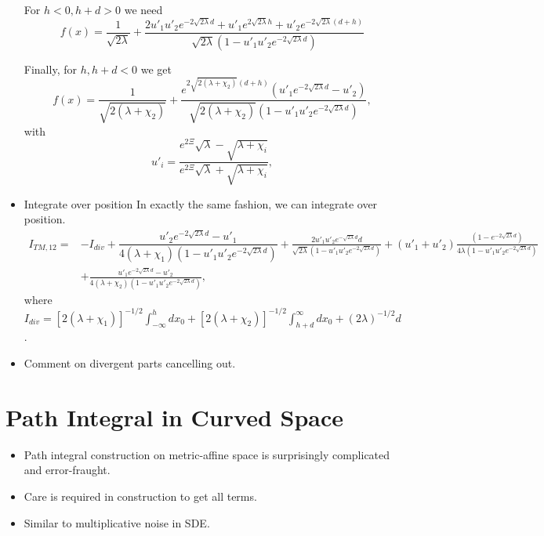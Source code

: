 \begin{itemize}
    For $h<0, h+d>0$ we need 
    \begin{equation}
      f(x) = \frac{1}{\sqrt{2\lambda}} + \frac{2u'_1u'_2 e^{-2\sqrt{2\lambda}d} + u'_1 e^{2\sqrt{2\lambda}h} +u'_2 e^{-2\sqrt{2\lambda}(d+h)}}{\sqrt{2\lambda}(1-u'_1u'_2 e^{-2\sqrt{2\lambda}d})}
    \end{equation}

    Finally, for $h,h+d<0$ we get 
    \begin{equation}
      f(x) =  \frac{1}{\sqrt{2(\lambda+\chi_2)}} + \frac{e^{2\sqrt{2(\lambda+\chi_2)}(d+h)}(u'_1 e^{-2\sqrt{2\lambda}d} - u'_2)}{\sqrt{2(\lambda+\chi_2)}(1-u'_1u'_2 e^{-2\sqrt{2\lambda}d})},
    \end{equation}
    with 
    \begin{equation}
      u'_i = \frac{e^{2\Xi}\sqrt{\lambda} -\sqrt{\lambda+\chi_i}}{e^{2\Xi}\sqrt{\lambda} + \sqrt{\lambda+\chi_i}},
    \end{equation}
  \item {Integrate over position}
    In exactly the same fashion, we can integrate over position.  
    \begin{align}
      I_{TM,12} =& -I_{div} + \dfrac{u'_2 e^{-2\sqrt{2\lambda}d}-u'_1}{4(\lambda+\chi_1)(1-u'_1u'_2 e^{-2\sqrt{2\lambda}d})} +\frac{2u'_1u'_2 e^{-\sqrt{2\lambda}d}d}{\sqrt{2\lambda}(1-u'_1u'_2 e^{-2\sqrt{2\lambda}d})} + (u'_1+u'_2)\frac{(1-e^{-2\sqrt{2\lambda}d})}{4\lambda(1-u'_1u'_2e^{-2\sqrt{2\lambda}d})}\nonumber\\
      & +\frac{u'_1 e^{-2\sqrt{2\lambda}d} - u'_2}{4(\lambda+\chi_2)(1-u'_1u'_2 e^{-2\sqrt{2\lambda}d})},
    \end{align}
    where $I_{div} = [2(\lambda+\chi_1)]^{-1/2}\int_{-\infty}^h dx_0  +  [2(\lambda+\chi_2)]^{-1/2}\int_{h+d}^\infty dx_0  + (2\lambda)^{-1/2}d$.
  \item Comment on divergent parts cancelling out. 
\end{itemize}

\section{Path Integral in Curved Space}

\begin{itemize}
  \item Path integral construction on metric-affine space is surprisingly complicated 
    and error-fraught.  
  \item Care is required in construction to get all terms.  
  \item Similar to multiplicative noise in SDE.
\end{itemize}

